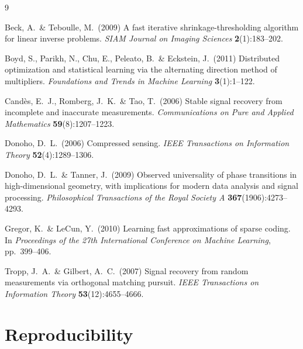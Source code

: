 \documentclass{article}
\begin{document}
{
\small
\begin{thebibliography}{9}

Beck, A.\ \& Teboulle, M.\ (2009) A fast iterative shrinkage-thresholding algorithm for linear inverse problems. {\it SIAM Journal on Imaging Sciences} {\bf 2}(1):183--202.

Boyd, S., Parikh, N., Chu, E., Peleato, B.\ \& Eckstein, J.\ (2011) Distributed optimization and statistical learning via the alternating direction method of multipliers. {\it Foundations and Trends in Machine Learning} {\bf 3}(1):1--122.

Cand\`es, E.\ J., Romberg, J.\ K.\ \& Tao, T.\ (2006) Stable signal recovery from incomplete and inaccurate measurements. {\it Communications on Pure and Applied Mathematics} {\bf 59}(8):1207--1223.

Donoho, D.\ L.\ (2006) Compressed sensing. {\it IEEE Transactions on Information Theory} {\bf 52}(4):1289--1306.

Donoho, D.\ L.\ \& Tanner, J.\ (2009) Observed universality of phase transitions in high-dimensional geometry, with implications for modern data analysis and signal processing. {\it Philosophical Transactions of the Royal Society A} {\bf 367}(1906):4273--4293.

Gregor, K.\ \& LeCun, Y.\ (2010) Learning fast approximations of sparse coding. In {\it Proceedings of the 27th International Conference on Machine Learning}, pp.\ 399--406.

Tropp, J.\ A.\ \& Gilbert, A.\ C.\ (2007) Signal recovery from random measurements via orthogonal matching pursuit. {\it IEEE Transactions on Information Theory} {\bf 53}(12):4655--4666.

\end{thebibliography}
}



\appendix

\section{Reproducibility}
\end{document}

